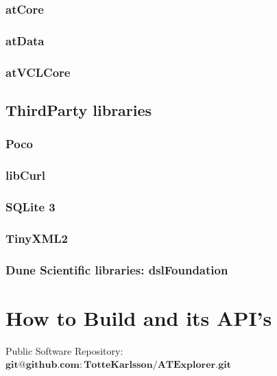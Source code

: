 \documentclass[11pt,fleqn]{book} %
\begin{document}
\begin{appendices}
\subsection{atCore}
\subsection{atData}
\subsection{atVCLCore}

\section{ThirdParty libraries}
\subsection{Poco}
\subsection{libCurl}
\subsection{SQLite 3}
\subsection{TinyXML2}
\subsection{Dune Scientific libraries: dslFoundation}


\chapter{How to Build \ate  and its API's}

Public Software Repository: $\mathbf{git@github.com:TotteKarlsson/ATExplorer.git}$



\end{appendices}
\end{document}
